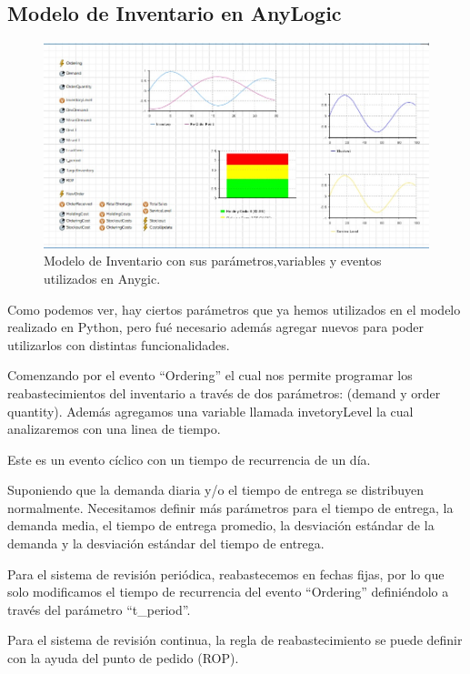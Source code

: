 \subsection{Modelo de Inventario en AnyLogic}
\label{subsec:modelo-de-inventario-en-anylogic}
\begin{figure}[H]
    \includegraphics[width=\linewidth]{images/anylogic-inventario}
    \caption{Modelo de Inventario con sus parámetros,variables y eventos utilizados en Anygic.}
\end{figure}

Como podemos ver, hay ciertos parámetros que ya hemos utilizados en el modelo realizado en Python, pero fué necesario además agregar nuevos para poder utilizarlos con distintas funcionalidades.

Comenzando por el evento ``Ordering'' el cual nos permite programar los reabastecimientos del inventario a través de dos parámetros: (demand y order quantity). Además agregamos una variable llamada invetoryLevel la cual analizaremos con una linea de tiempo.

Este es un evento cíclico con un tiempo de recurrencia de un día.

Suponiendo que la demanda diaria y/o el tiempo de entrega se distribuyen normalmente.
Necesitamos definir más  parámetros para el tiempo de entrega, la demanda media, el tiempo de entrega promedio, la desviación estándar de la demanda y la desviación estándar del tiempo de entrega.

Para el sistema de revisión periódica, reabastecemos en fechas fijas, por lo que solo modificamos el tiempo de recurrencia del evento ``Ordering'' definiéndolo a través del parámetro ``t\_period''.

Para el sistema de revisión continua, la regla de reabastecimiento se puede definir con la ayuda del punto de pedido (ROP).

